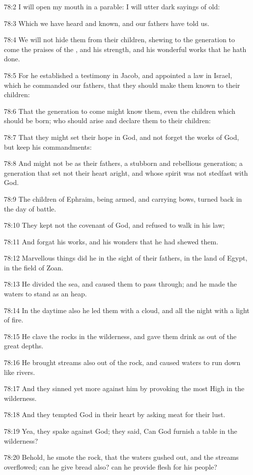 78:2 I will open my mouth in a parable: I will utter dark sayings of
old:

78:3 Which we have heard and known, and our fathers have told us.

78:4 We will not hide them from their children, shewing to the
generation to come the praises of the \LORD, and his strength, and his
wonderful works that he hath done.

78:5 For he established a testimony in Jacob, and appointed a law in
Israel, which he commanded our fathers, that they should make them
known to their children:

78:6 That the generation to come might know them, even the children
which should be born; who should arise and declare them to their
children:

78:7 That they might set their hope in God, and not forget the works
of God, but keep his commandments:

78:8 And might not be as their fathers, a stubborn and rebellious
generation; a generation that set not their heart aright, and whose
spirit was not stedfast with God.

78:9 The children of Ephraim, being armed, and carrying bows, turned
back in the day of battle.

78:10 They kept not the covenant of God, and refused to walk in his
law;

78:11 And forgat his works, and his wonders that he had shewed them.

78:12 Marvellous things did he in the sight of their fathers, in the
land of Egypt, in the field of Zoan.

78:13 He divided the sea, and caused them to pass through; and he made
the waters to stand as an heap.

78:14 In the daytime also he led them with a cloud, and all the night
with a light of fire.

78:15 He clave the rocks in the wilderness, and gave them drink as out
of the great depths.

78:16 He brought streams also out of the rock, and caused waters to
run down like rivers.

78:17 And they sinned yet more against him by provoking the most High
in the wilderness.

78:18 And they tempted God in their heart by asking meat for their
lust.

78:19 Yea, they spake against God; they said, Can God furnish a table
in the wilderness?

78:20 Behold, he smote the rock, that the waters gushed out, and the
streams overflowed; can he give bread also? can he provide flesh for
his people?

